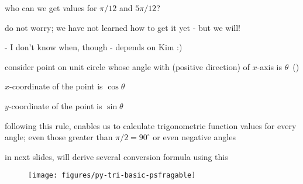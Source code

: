\documentclass[17pt,landscape]{foils}
\begin{document}
{{\vitem
	who can we get values for $\pi/12$ and $5\pi/12$?
	\bit
	\item
		do not worry; we have not learned how to get it yet - but we will!
		\bit
		\item [-] I don't know when, though - depends on Kim :)
		\eit
	\eit
\eit
\vfill


%
%
%
%
%
%

\bit
\item
	consider point on unit circle whose angle with (positive direction) of $x$-axis is $\theta$\
		()
	\bit
	\item
		$x$-coordinate of the point is $\cos \theta$
	\item
		$y$-coordinate of the point is $\sin \theta$
	\eit

\vitem
	following this rule,
	enables us to calculate trigonometric function values for every angle;
	even those greater than $\pi/2=90^\circ$ or even negative angles

\vitem
	in next slides, will derive several conversion formula using this
\eit

\begin{figure}
\begin{center}
	\texttt{[image: figures/py-tri-basic-psfragable]}%
		\label{fig:trigonometric function values as Cartesian coordinates of points on unit circle}
\end{center}
\end{figure}


}}
\end{document}
